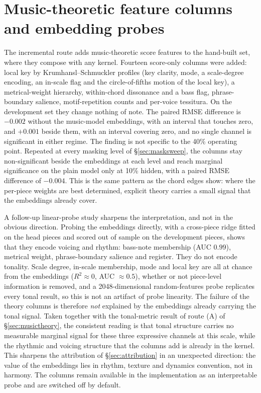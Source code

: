 \section{Music-theoretic feature columns and embedding probes}\label{app:theoryfeat}
The incremental route adds music-theoretic score features to the hand-built
set, where they compose with any kernel. Fourteen score-only columns were
added: local key by Krumhansl--Schmuckler profiles (key clarity, mode, a
scale-degree encoding, an in-scale flag and the circle-of-fifths motion of
the local key), a metrical-weight hierarchy, within-chord dissonance and a
bass flag, phrase-boundary salience, motif-repetition counts and per-voice
tessitura. On the development set they change nothing of note. The paired
RMSE difference is $-0.002$ without the music-model embeddings, with an
interval that touches zero, and $+0.001$ beside them, with an interval
covering zero, and no single channel is significant in either regime. The
finding is not specific to the 40\% operating point. Repeated at every
masking level of \S\ref{sec:masksweep}, the columns stay non-significant
beside the embeddings at each level and reach marginal significance on the
plain model only at 10\% hidden, with a paired RMSE difference of $-0.004$.
This is the same pattern as the chord edges show: where the per-piece
weights are best determined, explicit theory carries a small signal that
the embeddings already cover.

A follow-up linear-probe study sharpens the interpretation, and not in the
obvious direction. Probing the embeddings directly, with a cross-piece
ridge fitted on the head pieces and scored out of sample on the development
pieces, shows that they encode voicing and rhythm: bass-note membership
(AUC $0.99$), metrical weight, phrase-boundary salience and register. They
do not encode tonality. Scale degree, in-scale membership, mode and local
key are all at chance from the embeddings ($R^2 \approx 0$, AUC
$\approx 0.5$), whether or not piece-level information is removed, and a
2048-dimensional random-features probe replicates every tonal result, so
this is not an artifact of probe linearity. The failure of the theory
columns is therefore \emph{not} explained by the embeddings already
carrying the tonal signal. Taken together with the tonal-metric result of
route (A) of \S\ref{sec:musictheory}, the consistent reading is that tonal
structure carries no measurable marginal signal for these three expressive
channels at this scale, while the rhythmic and voicing structure that the
columns add is already in the kernel. This sharpens the attribution of
\S\ref{sec:attribution} in an unexpected direction: the value of the
embeddings lies in rhythm, texture and dynamics convention, not in harmony.
The columns remain available in the implementation as an interpretable
probe and are switched off by default.

